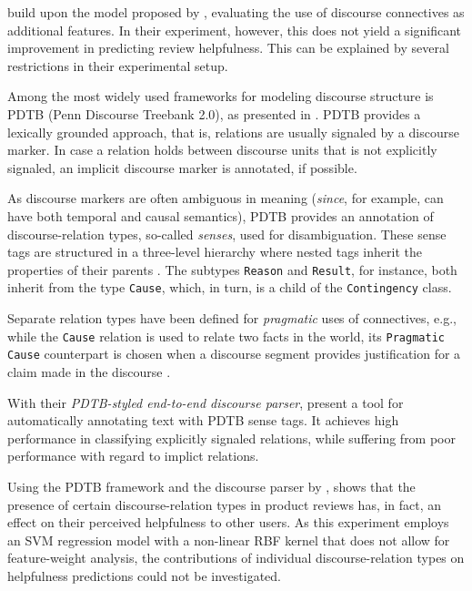 \documentclass[
    a4paper,%
    12pt,%
    oneside,%
    toc=bibliography,
    final,
]{scrartcl}
\begin{document}
\citet{Mertz2014} build upon the model proposed by \citet{Kim2006}, evaluating the use of discourse connectives as additional features. In their experiment, however, this does not yield a significant improvement in predicting review helpfulness. This can be explained by several restrictions in their experimental setup.

Among the most widely used frameworks for modeling discourse structure is PDTB (Penn Discourse Treebank 2.0), as presented in \citet{Prasad2008}. PDTB provides a lexically grounded approach, that is, relations are usually signaled by a discourse marker. In case a relation holds between discourse units that is not explicitly signaled, an implicit discourse marker is annotated, if possible.

As discourse markers are often ambiguous in meaning (\textit{since}, for example, can have both temporal and causal semantics), PDTB provides an annotation of discourse-relation types, so-called \textit{senses}, used for disambiguation. These sense tags are structured in a three-level hierarchy where nested tags inherit the properties of their parents \citep[cf.][5]{Prasad2008}. The subtypes \lstinline|Reason| and \lstinline|Result|, for instance, both inherit from the type \lstinline|Cause|, which, in turn, is a child of the \lstinline|Contingency| class.

Separate relation types have been defined for \textit{pragmatic} uses of connectives, e.g., while the \lstinline|Cause| relation is used to relate two facts in the world, its \lstinline|Pragmatic Cause| counterpart is chosen when a discourse segment provides justification for a claim made in the discourse \citep[cf.][29]{Prasad2007}.

With their \textit{PDTB-styled end-to-end discourse parser}, \citet{Lin2014} present a tool for automatically annotating text with PDTB sense tags. It achieves high performance in classifying explicitly signaled relations, while suffering from poor performance with regard to implict relations.

Using the PDTB framework and the discourse parser by \citet{Lin2014}, \citet{Golly2017} shows that the presence of certain discourse-relation types in product reviews has, in fact, an effect on their perceived helpfulness to other users. As this experiment employs an SVM regression model with a non-linear RBF kernel that does not allow for feature-weight analysis, the contributions of individual discourse-relation types on helpfulness predictions could not be investigated.
\end{document}
